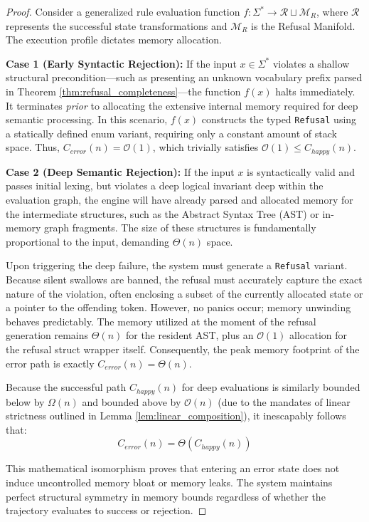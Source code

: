 \begin{proof}
Consider a generalized rule evaluation function $f: \Sigma^* \rightarrow \mathcal{R} \sqcup \mathcal{M}_R$, where $\mathcal{R}$ represents the successful state transformations and $\mathcal{M}_R$ is the Refusal Manifold. The execution profile dictates memory allocation. 

\textbf{Case 1 (Early Syntactic Rejection):} 
If the input $x \in \Sigma^*$ violates a shallow structural precondition—such as presenting an unknown vocabulary prefix parsed in Theorem \ref{thm:refusal_completeness}—the function $f(x)$ halts immediately. It terminates \textit{prior} to allocating the extensive internal memory required for deep semantic processing. 
In this scenario, $f(x)$ constructs the typed \texttt{Refusal} using a statically defined enum variant, requiring only a constant amount of stack space. Thus, $C_{error}(n) = \mathcal{O}(1)$, which trivially satisfies $\mathcal{O}(1) \le C_{happy}(n)$.

\textbf{Case 2 (Deep Semantic Rejection):} 
If the input $x$ is syntactically valid and passes initial lexing, but violates a deep logical invariant deep within the evaluation graph, the engine will have already parsed and allocated memory for the intermediate structures, such as the Abstract Syntax Tree (AST) or in-memory graph fragments. The size of these structures is fundamentally proportional to the input, demanding $\Theta(n)$ space.

Upon triggering the deep failure, the system must generate a \texttt{Refusal} variant. Because silent swallows are banned, the refusal must accurately capture the exact nature of the violation, often enclosing a subset of the currently allocated state or a pointer to the offending token. However, no panics occur; memory unwinding behaves predictably. The memory utilized at the moment of the refusal generation remains $\Theta(n)$ for the resident AST, plus an $\mathcal{O}(1)$ allocation for the refusal struct wrapper itself. Consequently, the peak memory footprint of the error path is exactly $C_{error}(n) = \Theta(n)$. 

Because the successful path $C_{happy}(n)$ for deep evaluations is similarly bounded below by $\Omega(n)$ and bounded above by $\mathcal{O}(n)$ (due to the mandates of linear strictness outlined in Lemma \ref{lem:linear_composition}), it inescapably follows that:
\begin{equation}
C_{error}(n) = \Theta(C_{happy}(n))
\end{equation}

This mathematical isomorphism proves that entering an error state does not induce uncontrolled memory bloat or memory leaks. The system maintains perfect structural symmetry in memory bounds regardless of whether the trajectory evaluates to success or rejection.
\end{proof}

